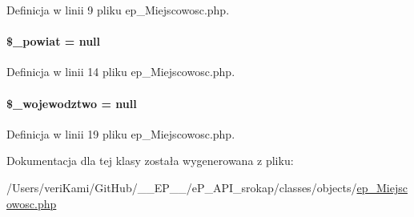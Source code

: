 Definicja w linii 9 pliku ep\-\_\-\-Miejscowosc.\-php.

\hypertarget{classep___miejscowosc_a928275f8378baade592a64f89da229ef}{
\paragraph[{\$\-\_\-powiat}]{\setlength{\rightskip}{0pt plus 5cm}\$\-\_\-powiat = null\hspace{0.3cm}{\ttfamily [protected]}}}\label{classep___miejscowosc_a928275f8378baade592a64f89da229ef}


Definicja w linii 14 pliku ep\-\_\-\-Miejscowosc.\-php.

\hypertarget{classep___miejscowosc_a2a0a830e555a9e31b5118be82dbc33c7}{
\paragraph[{\$\-\_\-wojewodztwo}]{\setlength{\rightskip}{0pt plus 5cm}\$\-\_\-wojewodztwo = null\hspace{0.3cm}{\ttfamily [protected]}}}\label{classep___miejscowosc_a2a0a830e555a9e31b5118be82dbc33c7}


Definicja w linii 19 pliku ep\-\_\-\-Miejscowosc.\-php.



Dokumentacja dla tej klasy została wygenerowana z pliku\-:\begin{DoxyCompactItemize}
\item 
/\-Users/veri\-Kami/\-Git\-Hub/\-\_\-\-\_\-\-E\-P\-\_\-\-\_\-/e\-P\-\_\-\-A\-P\-I\-\_\-srokap/classes/objects/\hyperlink{ep___miejscowosc_8php}{ep\-\_\-\-Miejscowosc.\-php}\end{DoxyCompactItemize}
